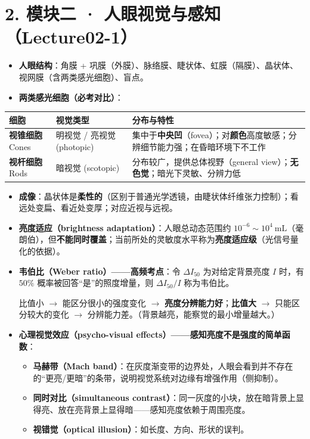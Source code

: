 \section*{2. 模块二 · 人眼视觉与感知（Lecture02-1）}
\begin{itemize}
\item \textbf{人眼结构}：角膜 + 巩膜（外膜）、脉络膜、睫状体、虹膜（隔膜）、晶状体、视网膜（含两类感光细胞）、盲点。
\item \textbf{两类感光细胞（必考对比）}：
\end{itemize}
\begin{center}\small\renewcommand{\arraystretch}{1.25}
\begin{tabularx}{\linewidth}{|>{\centering\arraybackslash}p{.16\linewidth}|p{.22\linewidth}|X|}\hline
\textbf{细胞}&\centering\textbf{视觉类型}&\centering\arraybackslash\textbf{分布与特性}\\\hline
\textbf{视锥细胞}\newline Cones&明视觉 / 亮视觉\newline (photopic)&集中于\textbf{中央凹}（fovea）；对\textbf{颜色}高度敏感；分辨细节能力强；在昏暗环境下不工作\\\hline
\textbf{视杆细胞}\newline Rods&暗视觉 (scotopic)&分布较广，提供总体视野（general view）；\textbf{无色觉}；暗光下灵敏、分辨力低\\\hline
\end{tabularx}\end{center}
\begin{itemize}
\item \textbf{成像}：晶状体是\textbf{柔性的}（区别于普通光学透镜，由睫状体纤维张力控制）；看远处变扁、看近处变厚；对应近视与远视。
\item \textbf{亮度适应（brightness adaptation）}：人眼总动态范围约 $10^{-6}\sim 10^4\ \mathrm{mL}$（毫朗伯），但\textbf{不能同时覆盖}；当前所处的灵敏度水平称为\textbf{亮度适应级}（光信号量化的依据）。
\item \textbf{韦伯比（Weber ratio）——高频考点}：令 $\Delta I_{50}$ 为对给定背景亮度 $I$ 时，有 $50\%$ 概率被回答“是”的照度增量，则 $\Delta I_{50}/I$ 称为韦伯比。\par
比值小 $\to$ 能区分很小的强度变化 $\to$ \textbf{亮度分辨能力好}；\textbf{比值大} $\to$ 只能区分较大的变化 $\to$ 分辨能力差。（背景越亮，能察觉的最小增量越大。）
\item \textbf{心理视觉效应（psycho-visual effects）——感知亮度不是强度的简单函数}：
\begin{itemize}
\item \textbf{马赫带（Mach band）}：在灰度渐变带的边界处，人眼会看到并不存在的“更亮/更暗”的条带，说明视觉系统对边缘有增强作用（侧抑制）。
\item \textbf{同时对比（simultaneous contrast）}：同一灰度的小块，放在暗背景上显得亮、放在亮背景上显得暗——感知亮度依赖于周围亮度。
\item \textbf{视错觉（optical illusion）}：如长度、方向、形状的误判。
\end{itemize}
\end{itemize}
